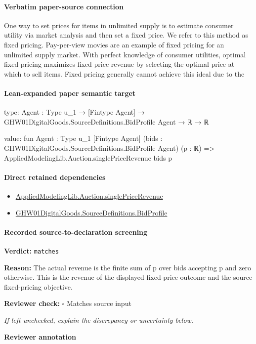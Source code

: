 \documentclass[10pt]{article}
\newcommand{\reviewerbox}{%
  \par\noindent\fbox{\parbox{0.96\linewidth}{\rule{0pt}{0.38in}}}\par
}
\newcommand{\reviewmatch}[1]{%
  \par\noindent\textbf{Reviewer check:} $\square$\; #1\par
  \noindent\emph{If left unchecked, explain the discrepancy or uncertainty below.}\par
}
\begin{document}
\paragraph{Verbatim paper-source connection}
\begin{ReviewVerbatim}
One way to set prices for items in unlimited supply
is to estimate consumer utility via market analysis
and then set a fixed price. We refer to this method
as fixed pricing. Pay-per-view movies are an example of fixed pricing for an unlimited supply market.
With perfect knowledge of consumer utilities, optimal
fixed pricing maximizes fixed-price revenue by selecting the optimal price at which to sell items. Fixed
pricing generally cannot achieve this ideal due to the
\end{ReviewVerbatim}



\paragraph{Lean-expanded paper semantic target}
\begin{ReviewVerbatim}
type:
{Agent : Type u_1} → [Fintype Agent] → GHW01DigitalGoods.SourceDefinitions.BidProfile Agent → ℝ → ℝ

value:
fun {Agent : Type u_1} [Fintype Agent] (bids : GHW01DigitalGoods.SourceDefinitions.BidProfile Agent) (p : ℝ) =>
  AppliedModelingLib.Auction.singlePriceRevenue bids p
\end{ReviewVerbatim}

\paragraph{Direct retained dependencies}
\begin{itemize}\raggedright
\item \hyperlink{governing-declaration-860eab71bfbde2a2}{Applied\allowbreak{}Modeling\allowbreak{}Lib.\allowbreak{}Auction.\allowbreak{}single\allowbreak{}Price\allowbreak{}Revenue}
\item \hyperlink{paper-prerequisite-ac8769d0dccf04f4}{GHW01\allowbreak{}Digital\allowbreak{}Goods.\allowbreak{}Source\allowbreak{}Definitions.\allowbreak{}Bid\allowbreak{}Profile}
\end{itemize}
\paragraph{Recorded source-to-declaration screening}
\textbf{Verdict:} \texttt{matches}
\\
{\raggedright
\textbf{Reason:} The actual revenue is the finite sum of p over bids accepting p and zero otherwise.\allowbreak{} This is the revenue of the displayed fixed-\allowbreak{}price outcome and the source fixed-\allowbreak{}pricing objective.\allowbreak{}
\par}
\reviewmatch{Matches source input}
\noindent\textbf{Reviewer annotation}\par
\reviewerbox
\clearpage
\hypertarget{paper-prerequisite-4fcd7524a5594ff6}{}
\end{document}

